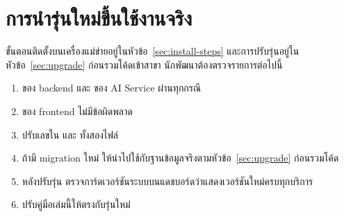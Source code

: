 \section{การนำรุ่นใหม่ขึ้นใช้งานจริง}

ขั้นตอนติดตั้งบนเครื่องแม่ข่ายอยู่ในหัวข้อ~\ref{sec:install-steps} และการปรับรุ่นอยู่ในหัวข้อ~\ref{sec:upgrade} ก่อนรวมโค้ดเข้าสาขา  นักพัฒนาต้องตรวจรายการต่อไปนี้

\begin{enumerate}
\item {} ของ backend และ  ของ AI Service ผ่านทุกกรณี
\item {} ของ frontend ไม่มีข้อผิดพลาด
\item ปรับเลขใน  และ  ทั้งสองไฟล์
\item ถ้ามี migration ใหม่ ให้นำไปใช้กับฐานข้อมูลจริงตามหัวข้อ~\ref{sec:upgrade} ก่อนรวมโค้ด
\item หลังปรับรุ่น ตรวจการ์ดเวอร์ชันระบบบนแดชบอร์ดว่าแสดงเวอร์ชันใหม่ครบทุกบริการ
\item ปรับคู่มือเล่มนี้ให้ตรงกับรุ่นใหม่
\end{enumerate}

